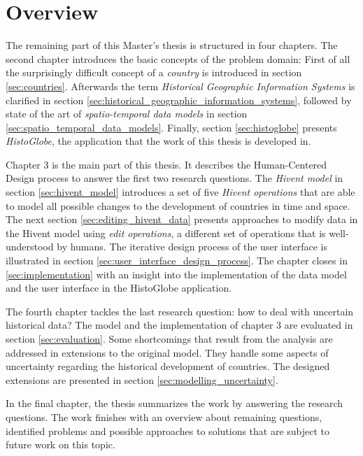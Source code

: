 \section{Overview} %
\label{sec:overview}

The remaining part of this Master's thesis is structured in four chapters. The second chapter introduces the basic concepts of the problem domain: First of all the surprisingly difficult concept of a \emph{country} is introduced in section \ref{sec:countries}. Afterwards the term \emph{Historical Geographic Information Systems} is clarified in section \ref{sec:historical_geographic_information_systems}, followed by state of the art of \emph{spatio-temporal data models}  in section \ref{sec:spatio_temporal_data_models}. Finally, section \ref{sec:histoglobe} presents \emph{HistoGlobe}, the application that the work of this thesis is developed in.

Chapter 3 is the main part of this thesis. It describes the Human-Centered Design process to answer the first two research questions. The \emph{Hivent model} in section \ref{sec:hivent_model} introduces a set of five \emph{Hivent operations} that are able to model all possible changes to the development of countries in time and space. The next section \ref{sec:editing_hivent_data} presents approaches to modify data in the Hivent model using \emph{edit operations}, a different set of operations that is well-understood by humans. The iterative design process of the user interface is illustrated in section \ref{sec:user_interface_design_process}. The chapter closes in \ref{sec:implementation} with an insight into the implementation of the data model and the user interface in the HistoGlobe application.

The fourth chapter tackles the last research question: how to deal with uncertain historical data? The model and the implementation of chapter 3 are evaluated in section \ref{sec:evaluation}. Some shortcomings that result from the analysis are addressed in extensions to the original model. They handle some aspects of uncertainty regarding the historical development of countries. The designed extensions are presented in section \ref{sec:modelling_uncertainty}.

In the final chapter, the thesis summarizes the work by answering the research questions. The work finishes with an overview about remaining questions, identified problems and possible approaches to solutions that are subject to future work on this topic.



